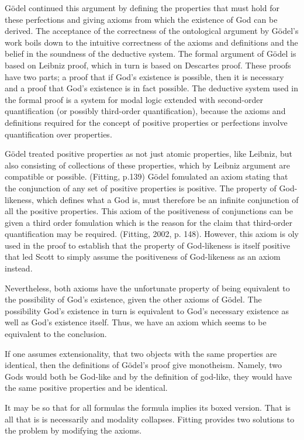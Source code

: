 \documentclass{article}
\begin{document}
G\"odel continued this argument by defining the properties that must hold for these perfections and giving axioms from which the existence of God can be derived. The acceptance of the correctness of the ontological argument by G\"odel's work boils down to the intuitive correctness of the axioms and definitions and the belief in the soundness of the deductive system. The formal argument of G\"odel is based on Leibniz proof, which in turn is based on Descartes proof. These proofs have two parts; a proof that if God's existence is possible, then it is necessary and a proof that God's existence is in fact possible. The deductive system used in the formal proof is a system for modal logic extended with second-order quantification (or possibly third-order quantification), because the axioms and definitions required for the concept of positive properties or perfections involve quantification over properties. 

G\"odel treated positive properties as not just atomic properties, like Leibniz, but also consisting of collections of these properties, which by Leibniz argument are compatible or possible. (Fitting, p.139) G\"odel fomulated an axiom stating that the conjunction of any set of positive properties is positive. The property of God-likeness, which defines what a God is, must therefore be an infinite conjunction of all the positive properties. This axiom of the positiveness of conjunctions can be given a third order fomulation which is the reason for the claim that third-order quantification may be required. (Fitting, 2002, p. 148). However, this axiom is oly used in the proof to establish that the property of God-likeness is itself positive that led Scott to simply assume the positiveness of  God-likeness as an axiom instead. 

Nevertheless, both axioms have the unfortunate property of being equivalent to the possibility of God's existence, given the other axioms of G\"odel. The possibility  God's existence in turn is equivalent to  God's necessary existence as well as  God's existence itself. Thus, we have an axiom which seems to be equivalent to the conclusion. 

If one assumes extensionality, that two objects with the same properties are identical, then the definitions of G\"odel's proof give monotheism. Namely, two Gods would both be God-like and by the definition of god-like, they would have the same positive properties and be identical. 


It may be so that for all formulas the formula implies its boxed version. That is all that is is necessarily and modality collapses. Fitting provides two solutions to the problem by modifying the axioms. 
\end{document}
